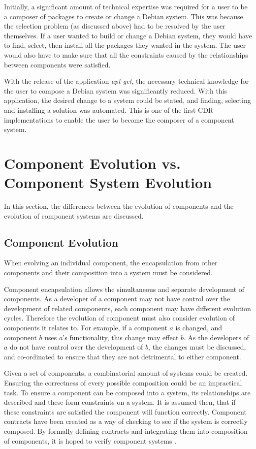 Initially, a significant amount of technical expertise was required for a user to be a composer of packages to create or change a Debian system.
This was because the selection problem (as discussed above) had to be resolved by the user themselves.
If a user wanted to build or change a Debian system, they would have to find, select, then install all the packages they wanted in the system.
The user would also have to make sure that all the constraints caused by the relationships between components were satisfied.

With the release of the application \textit{apt-get}, the necessary technical knowledge for the user to compose a Debian system was significantly reduced.
With this application, the desired change to a system could be stated, and finding, selecting and installing a solution was automated.
This is one of the first CDR implementations to enable the user to become the composer of a component system.

\section{Component Evolution vs. Component System Evolution}
\label{background.componentsystemevolution}
In this section, the differences between the evolution of components and the evolution of component systems are discussed.

\subsection{Component Evolution}
When evolving an individual component, the encapsulation from other components and their composition into a system must be considered.

Component encapsulation allows the simultaneous and separate development of components.
As a developer of a component may not have control over the development of related components, each component may have different evolution cycles.
Therefore the evolution of component must also consider evolution of components it relates to.
For example, if a component $a$ is changed, and component $b$ uses $a$'s functionality, this change may effect $b$.
As the developers of $a$ do not have control over the development of $b$, the changes must be discussed, and co-ordinated to ensure that they are not detrimental to either component.

Given a set of components, a combinatorial amount of systems could be created.
Ensuring the correctness of every possible composition could be an impractical task.
To ensure a component can be composed into a system, its relationships are described and these form constraints on a system.
It is assumed then, that if these constraints are satisfied the component will function correctly.
Component contracts \citep{Watkins1999} have been created as a way of checking to see if the system is correctly composed.
By formally defining contracts and integrating them into composition of components, it is hoped to verify component systems \citep{Dietrich2010}.

